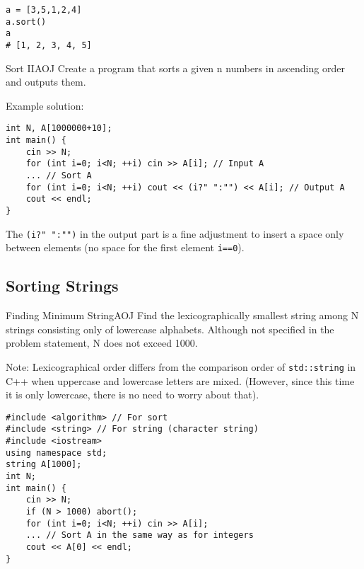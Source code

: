 \begin{pybox}[emph=sort]
\begin{verbatim}
a = [3,5,1,2,4]
a.sort()
a
# [1, 2, 3, 4, 5]
\end{verbatim}
\end{pybox}


\begin{psbox}{Sort II}{AOJ}
Create a program that sorts a given n numbers in ascending order and outputs them.

\end{psbox}

Example solution:
\begin{cbox}
\begin{verbatim}
int N, A[1000000+10];
int main() {
    cin >> N;
    for (int i=0; i<N; ++i) cin >> A[i]; // Input A
    ... // Sort A
    for (int i=0; i<N; ++i) cout << (i?" ":"") << A[i]; // Output A
    cout << endl;
}
\end{verbatim}
\end{cbox}

The \texttt{(i?" ":"")} in the output part is a fine adjustment to insert a space only between elements (no space for the first element \texttt{i==0}).

\subsection{Sorting Strings}

\begin{psbox}{Finding Minimum String}{AOJ}
Find the lexicographically smallest string among N strings consisting only of lowercase alphabets.
Although not specified in the problem statement, N does not exceed 1000.

\end{psbox}

Note: Lexicographical order differs from the comparison order of \texttt{std::string} in C++ when uppercase and lowercase letters are mixed. (However, since this time it is only lowercase, there is no need to worry about that).

\begin{cbox}
\begin{verbatim}
#include <algorithm> // For sort
#include <string> // For string (character string)
#include <iostream>
using namespace std;
string A[1000];
int N;
int main() {
    cin >> N;
    if (N > 1000) abort();
    for (int i=0; i<N; ++i) cin >> A[i];
    ... // Sort A in the same way as for integers
    cout << A[0] << endl;
}
\end{verbatim}
\end{cbox}
